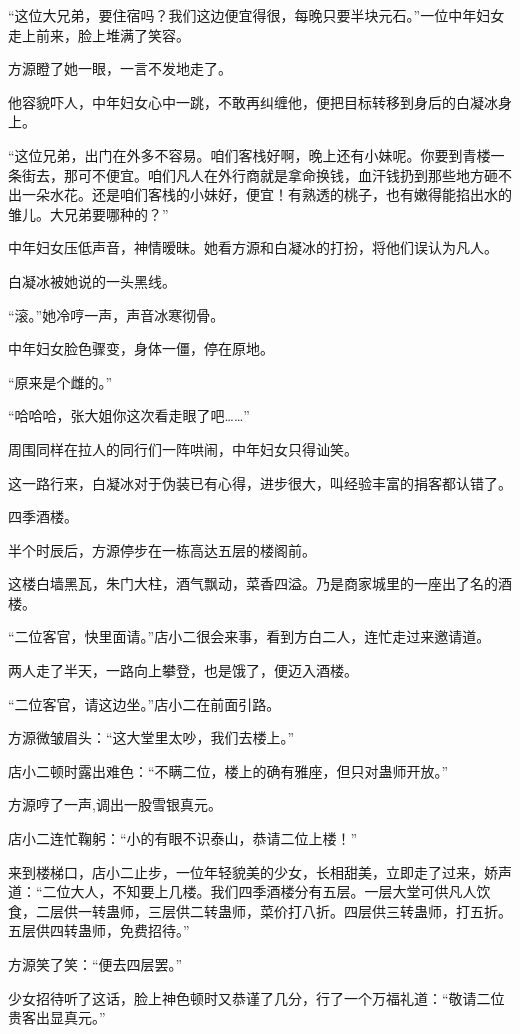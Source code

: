 \begin{this_body}
“这位大兄弟，要住宿吗？我们这边便宜得很，每晚只要半块元石。”一位中年妇女走上前来，脸上堆满了笑容。

方源瞪了她一眼，一言不发地走了。

他容貌吓人，中年妇女心中一跳，不敢再纠缠他，便把目标转移到身后的白凝冰身上。

“这位兄弟，出门在外多不容易。咱们客栈好啊，晚上还有小妹呢。你要到青楼一条街去，那可不便宜。咱们凡人在外行商就是拿命换钱，血汗钱扔到那些地方砸不出一朵水花。还是咱们客栈的小妹好，便宜！有熟透的桃子，也有嫩得能掐出水的雏儿。大兄弟要哪种的？”

中年妇女压低声音，神情暧昧。她看方源和白凝冰的打扮，将他们误认为凡人。

白凝冰被她说的一头黑线。

“滚。”她冷哼一声，声音冰寒彻骨。

中年妇女脸色骤变，身体一僵，停在原地。

“原来是个雌的。”

“哈哈哈，张大姐你这次看走眼了吧……”

周围同样在拉人的同行们一阵哄闹，中年妇女只得讪笑。

这一路行来，白凝冰对于伪装已有心得，进步很大，叫经验丰富的捐客都认错了。

四季酒楼。

半个时辰后，方源停步在一栋高达五层的楼阁前。

这楼白墙黑瓦，朱门大柱，酒气飘动，菜香四溢。乃是商家城里的一座出了名的酒楼。

“二位客官，快里面请。”店小二很会来事，看到方白二人，连忙走过来邀请道。

两人走了半天，一路向上攀登，也是饿了，便迈入酒楼。

“二位客官，请这边坐。”店小二在前面引路。

方源微皱眉头：“这大堂里太吵，我们去楼上。”

店小二顿时露出难色：“不瞒二位，楼上的确有雅座，但只对蛊师开放。”

方源哼了一声,调出一股雪银真元。

店小二连忙鞠躬：“小的有眼不识泰山，恭请二位上楼！”

来到楼梯口，店小二止步，一位年轻貌美的少女，长相甜美，立即走了过来，娇声道：“二位大人，不知要上几楼。我们四季酒楼分有五层。一层大堂可供凡人饮食，二层供一转蛊师，三层供二转蛊师，菜价打八折。四层供三转蛊师，打五折。五层供四转蛊师，免费招待。”

方源笑了笑：“便去四层罢。”

少女招待听了这话，脸上神色顿时又恭谨了几分，行了一个万福礼道：“敬请二位贵客出显真元。”

\end{this_body}

